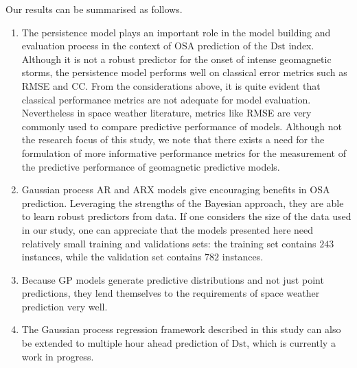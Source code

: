 Our results can be summarised as follows.
\begin{enumerate}
      \item The persistence model plays an important role in the model building and evaluation 
      process in the context of OSA prediction of the $\mathrm{Dst}$ index. 
      Although it is not a robust predictor for the onset of intense geomagnetic storms, the 
      persistence model performs well on classical error metrics such as 
      RMSE and CC. From the considerations above, it is quite evident that classical performance 
      metrics are not adequate for model evaluation. Nevertheless in space weather literature, 
      metrics like RMSE are very commonly used to compare predictive performance of models. 
      Although not the research focus of this study, we note that there exists a need for the 
      formulation of more informative performance metrics for the measurement of the 
      predictive performance of geomagnetic predictive models.
      
      \item Gaussian process AR and ARX models give encouraging benefits in OSA prediction. 
      Leveraging the strengths of the Bayesian approach, they are able to learn robust predictors 
      from data. If one considers the size of the data used in our study, one can appreciate that 
      the models presented here need relatively small training and validations sets: the training 
      set contains $243$ instances, while the validation set contains $782$ instances.
      
      \item Because GP models generate predictive distributions and not just point predictions, 
      they lend themselves to the requirements of space weather prediction very well.
      
      \item The Gaussian process regression framework described in this study can also be 
      extended to multiple hour ahead prediction of $ \mathrm{Dst}$, which is currently a work in 
      progress.
\end{enumerate}





%
%
%
%
%

